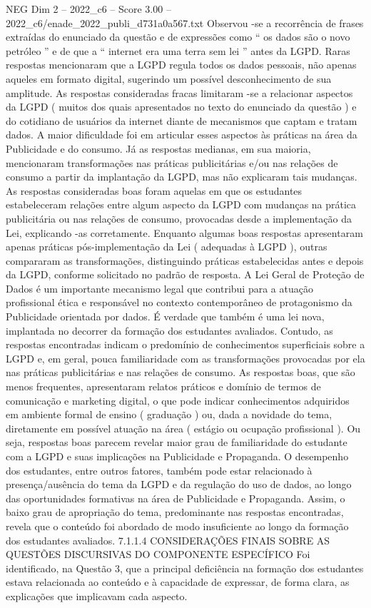 \begin{textsample}{NEG Dim 2 – 2022\_c6 – Score 3.00 – 2022\_c6/enade\_2022\_publi\_d731a0a567.txt}
Observou -se a recorrência de frases extraídas do enunciado da questão e de expressões como “ os dados são o novo petróleo ” e de que a “ internet era uma terra sem lei ” antes da LGPD.
Raras respostas mencionaram que a LGPD regula todos os dados pessoais, não apenas aqueles em formato digital, sugerindo um possível desconhecimento de sua amplitude.
As respostas consideradas fracas limitaram -se a relacionar aspectos da LGPD ( muitos dos quais apresentados no texto do enunciado da questão ) e do cotidiano de usuários da internet diante de mecanismos que captam e tratam dados.
A maior dificuldade foi em articular esses aspectos às práticas na área da Publicidade e do consumo.
Já as respostas medianas, em sua maioria, mencionaram transformações nas práticas publicitárias e/ou nas relações de consumo a partir da implantação da LGPD, mas não explicaram tais mudanças.
As respostas consideradas boas foram aquelas em que os estudantes estabeleceram relações entre algum aspecto da LGPD com mudanças na prática publicitária ou nas relações de consumo, provocadas desde a implementação da Lei, explicando -as corretamente.
Enquanto algumas boas respostas apresentaram apenas práticas pós-implementação da Lei ( adequadas à LGPD ), outras compararam as transformações, distinguindo práticas estabelecidas antes e depois da LGPD, conforme solicitado no padrão de resposta.
A Lei Geral de Proteção de Dados é um importante mecanismo legal que contribui para a atuação profissional ética e responsável no contexto contemporâneo de protagonismo da Publicidade orientada por dados.
É verdade que também é uma lei nova, implantada no decorrer da formação dos estudantes avaliados.
Contudo, as respostas encontradas indicam o predomínio de conhecimentos superficiais sobre a LGPD e, em geral, pouca familiaridade com as transformações provocadas por ela nas práticas publicitárias e nas relações de consumo.
As respostas boas, que são menos frequentes, apresentaram relatos práticos e domínio de termos de comunicação e marketing digital, o que pode indicar conhecimentos adquiridos em ambiente formal de ensino ( graduação ) ou, dada a novidade do tema, diretamente em possível atuação na área ( estágio ou ocupação profissional ).
Ou seja, respostas boas parecem revelar maior grau de familiaridade do estudante com a LGPD e suas implicações na Publicidade e Propaganda.
O desempenho dos estudantes, entre outros fatores, também pode estar relacionado à presença/ausência do tema da LGPD e da regulação do uso de dados, ao longo das oportunidades formativas na área de Publicidade e Propaganda.
Assim, o baixo grau de apropriação do tema, predominante nas respostas encontradas, revela que o conteúdo foi abordado de modo insuficiente ao longo da formação dos estudantes avaliados. 7.1.1.4 CONSIDERAÇÕES FINAIS SOBRE AS QUESTÕES DISCURSIVAS DO COMPONENTE ESPECÍFICO Foi identificado, na Questão 3, que a principal deficiência na formação dos estudantes estava relacionada ao conteúdo e à capacidade de expressar, de forma clara, as explicações que implicavam cada aspecto.

\end{textsample}
